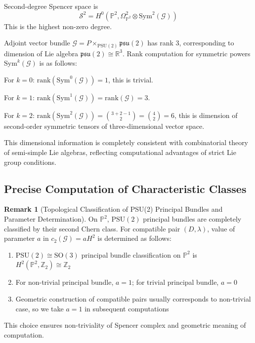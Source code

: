 \documentclass[a4paper,12pt]{extarticle}
\theoremstyle{definition}
\newtheorem{remark}{Remark}
\begin{document}
Second-degree Spencer space is
$$\mathcal{S}^2 = H^0(\mathbb{P}^2, \Omega^2_{\mathbb{P}^2} \otimes \mathrm{Sym}^2(\mathcal{G}))$$
This is the highest non-zero degree.

Adjoint vector bundle $\mathcal{G} = P \times_{\text{PSU}(2)} \mathfrak{psu}(2)$ has rank 3, corresponding to dimension of Lie algebra $\mathfrak{psu}(2) \cong \mathbb{R}^3$. Rank computation for symmetric powers $\mathrm{Sym}^k(\mathcal{G})$ is as follows:

For $k = 0$: $\mathrm{rank}(\mathrm{Sym}^0(\mathcal{G})) = 1$, this is trivial.

For $k = 1$: $\mathrm{rank}(\mathrm{Sym}^1(\mathcal{G})) = \mathrm{rank}(\mathcal{G}) = 3$.

For $k = 2$: $\mathrm{rank}(\mathrm{Sym}^2(\mathcal{G})) = \binom{3+2-1}{2} = \binom{4}{2} = 6$, this is dimension of second-order symmetric tensors of three-dimensional vector space.

This dimensional information is completely consistent with combinatorial theory of semi-simple Lie algebras\cite{humphreys1972introduction}, reflecting computational advantages of strict Lie group conditions.

\subsection{Precise Computation of Characteristic Classes}

\begin{remark}[Topological Classification of PSU(2) Principal Bundles and Parameter Determination]
On $\mathbb{P}^2$, $\text{PSU}(2)$ principal bundles are completely classified by their second Chern class. For compatible pair $(D,\lambda)$, value of parameter $a$ in $c_2(\mathcal{G}) = aH^2$ is determined as follows:
\begin{enumerate}
\item $\text{PSU}(2) \cong \text{SO}(3)$ principal bundle classification on $\mathbb{P}^2$ is $H^2(\mathbb{P}^2, \mathbb{Z}_2) \cong \mathbb{Z}_2$
\item For non-trivial principal bundle, $a = 1$; for trivial principal bundle, $a = 0$
\item Geometric construction of compatible pairs usually corresponds to non-trivial case, so we take $a = 1$ in subsequent computations
\end{enumerate}
This choice ensures non-triviality of Spencer complex and geometric meaning of computation.
\end{remark}
\end{document}

